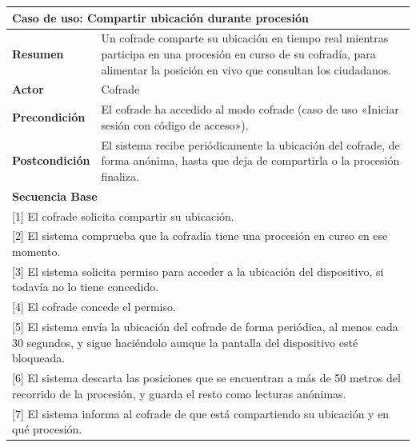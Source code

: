 \begin{table}[h!]
    \centering
    \renewcommand{\arraystretch}{1.3}

    \begin{tabular}{|p{4cm}|p{11cm}|}
        \hline
        \multicolumn{2}{|l|}{\textbf{Caso de uso: Compartir ubicación durante procesión}} \\
        \hline
        \textbf{Resumen} & Un cofrade comparte su ubicación en tiempo real mientras participa en una procesión en curso de su cofradía, para alimentar la posición en vivo que consultan los ciudadanos. \\
        \hline
        \textbf{Actor} & Cofrade \\
        \hline
        \textbf{Precondición} & El cofrade ha accedido al modo cofrade (caso de uso «Iniciar sesión con código de acceso»). \\
        \hline
        \textbf{Postcondición} & El sistema recibe periódicamente la ubicación del cofrade, de forma anónima, hasta que deja de compartirla o la procesión finaliza. \\
        \hline
        \multicolumn{2}{|l|}{\textbf{Secuencia Base}} \\
        \hline
        \multicolumn{2}{|p{15cm}|}{ [1] El cofrade solicita compartir su ubicación. } \\
        \hline
        \multicolumn{2}{|p{15cm}|}{ [2] El sistema comprueba que la cofradía tiene una procesión en curso en ese momento. } \\
        \hline
        \multicolumn{2}{|p{15cm}|}{ [3] El sistema solicita permiso para acceder a la ubicación del dispositivo, si todavía no lo tiene concedido. } \\
        \hline
        \multicolumn{2}{|p{15cm}|}{ [4] El cofrade concede el permiso. } \\
        \hline
        \multicolumn{2}{|p{15cm}|}{ [5] El sistema envía la ubicación del cofrade de forma periódica, al menos cada 30 segundos, y sigue haciéndolo aunque la pantalla del dispositivo esté bloqueada. } \\
        \hline
        \multicolumn{2}{|p{15cm}|}{ [6] El sistema descarta las posiciones que se encuentran a más de 50 metros del recorrido de la procesión, y guarda el resto como lecturas anónimas. } \\
        \hline
        \multicolumn{2}{|p{15cm}|}{ [7] El sistema informa al cofrade de que está compartiendo su ubicación y en qué procesión. } \\

\end{tabular}
\end{table}
